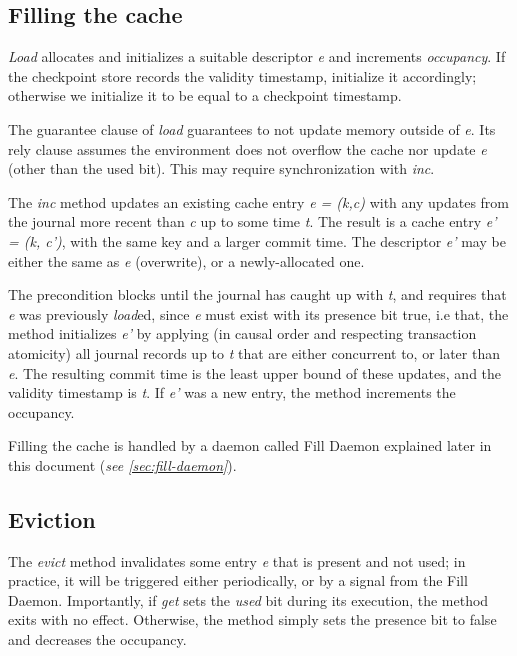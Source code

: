 \documentclass[twoside]{article}
\begin{document}
\subsection{Filling the cache}
\label{sec:cache-loading}

\emph{Load} allocates and initializes a suitable descriptor \emph{e} and
increments \emph{occupancy}.
If the checkpoint store records the validity timestamp, initialize it accordingly;
otherwise we initialize it to be equal to a checkpoint timestamp.

The guarantee clause of \emph{load} guarantees to not update memory outside of 
\emph{e}.
Its rely clause assumes the environment does not overflow the cache nor update
\emph{e} (other than the used bit).
This may require synchronization with \emph{inc}.

The \emph{inc} method updates an existing cache entry \emph{e = (k,c)}
with any updates from the journal more recent than \emph{c} up to some
time \emph{t}.
The result is a cache entry \emph{e' = (k, c')}, with the same key and a
larger commit time.
The descriptor \emph{e'} may be either the same as \emph{e} (overwrite),
or a newly-allocated one.

The precondition blocks until the journal has caught up with \emph{t},
and requires that \emph{e} was previously \emph{load}ed, since \emph{e}
must exist with its presence bit true, i.e that,
the method initializes \emph{e'} by applying (in causal order and
respecting transaction atomicity) all journal records up to \emph{t}
that are either concurrent to, or later than \emph{e}.
The resulting commit time is the least upper bound of these updates, and
the validity timestamp is \emph{t}.
If \emph{e'} was a new entry, the method increments the occupancy.

Filling the cache is handled by a daemon called Fill Daemon explained later 
in this document (\emph{see \ref{sec:fill-daemon}}).

\subsection{Eviction}
\label{sec:eviction}

The \emph{evict} method invalidates some entry \emph{e} that is present
and not used; in practice, it will be triggered either periodically, or
by a signal from the Fill Daemon.
Importantly, if \emph{get} sets the \emph{used} bit during its
execution, the method exits with no effect.
Otherwise, the method simply sets the presence bit to false and
decreases the occupancy.
\end{document}

